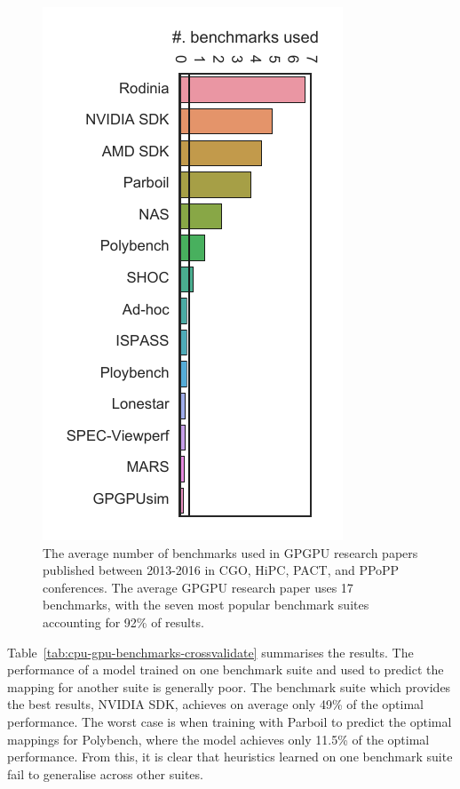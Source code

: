 \begin{figure}
  \centering
  \includegraphics[width=.57\textwidth,angle=90]{img/motivation-c} %
  \caption[Benchmark counts in GPGPU research papers]{%
    The average number of benchmarks used in GPGPU research papers published between 2013-2016 in CGO, HiPC, PACT, and PPoPP conferences. The average GPGPU research paper uses 17 benchmarks, with the seven most popular benchmark suites accounting for 92\% of results.%
  }%
  \label{fig:benchmark-suite-distribution}
\end{figure}

Table~\ref{tab:cpu-gpu-benchmarks-crossvalidate} summarises the results. The performance of a model trained on one benchmark suite and used to predict the mapping for another suite is generally poor. The benchmark suite which provides the best results, NVIDIA SDK, achieves on average only 49\% of the optimal performance. The worst case is when training with Parboil to predict the optimal mappings for Polybench, where the model achieves only 11.5\% of the optimal performance. From this, it is clear that heuristics learned on one benchmark suite fail to generalise across other suites.

\begin{table}
  \centering
  
  \caption[Cross-validation of benchmark suites on a predictive model]{%
    Performance relative to the optimal of the \citeauthor{Grewe2013} predictive model across different benchmark suites on an AMD GPU. The columns show the suite used for training; the rows show the suite used for testing. On average, a predictive model trained on one benchmark suite and tested on another achieves only 49\% of the optimal performance.%
  }
  \label{tab:cpu-gpu-benchmarks-crossvalidate}
\end{table}

